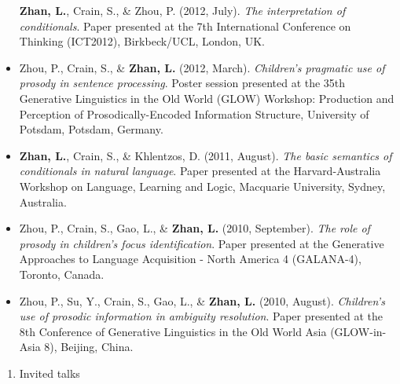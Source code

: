 \documentclass[12pt,]{article}
\providecommand{\tightlist}{%
  \setlength{\itemsep}{0pt}\setlength{\parskip}{0pt}}
\begin{document}
\begin{itemize}
  \textbf{Zhan, L.}, Crain, S., \& Zhou, P. (2012, July). \emph{The
  interpretation of conditionals}. Paper presented at the 7th
  International Conference on Thinking (ICT2012), Birkbeck/UCL, London,
  UK.
\item
  Zhou, P., Crain, S., \& \textbf{Zhan, L.} (2012, March).
  \emph{Children's pragmatic use of prosody in sentence processing}.
  Poster session presented at the 35th Generative Linguistics in the Old
  World (GLOW) Workshop: Production and Perception of
  Prosodically-Encoded Information Structure, University of Potsdam,
  Potsdam, Germany.
\item
  \textbf{Zhan, L.}, Crain, S., \& Khlentzos, D. (2011, August).
  \emph{The basic semantics of conditionals in natural language}. Paper
  presented at the Harvard-Australia Workshop on Language, Learning and
  Logic, Macquarie University, Sydney, Australia.
\item
  Zhou, P., Crain, S., Gao, L., \& \textbf{Zhan, L.} (2010, September).
  \emph{The role of prosody in children's focus identification}. Paper
  presented at the Generative Approaches to Language Acquisition - North
  America 4 (GALANA-4), Toronto, Canada.
\item
  Zhou, P., Su, Y., Crain, S., Gao, L., \& \textbf{Zhan, L.} (2010,
  August). \emph{Children's use of prosodic information in ambiguity
  resolution}. Paper presented at the 8th Conference of Generative
  Linguistics in the Old World Asia (GLOW-in-Asia 8), Beijing, China.
\end{itemize}

\begin{enumerate}
\def\labelenumi{\arabic{enumi}.}
\setcounter{enumi}{4}
\tightlist
\item
  Invited talks
\end{enumerate}
\end{document}
